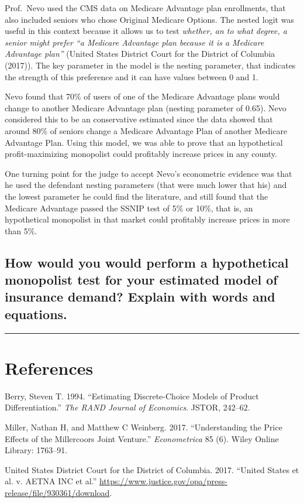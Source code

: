 \documentclass[]{article}
\begin{document}
Prof.~Nevo used the CMS data on Medicare Advantage plan enrollments,
that also included seniors who chose Original Medicare Options. The
nested logit was useful in this context because it allows us to test
\emph{whether, an to what degree, a senior might prefer ``a Medicare
Advantage plan because it is a Medicare Advantage plan''} (United States
District Court for the District of Columbia (2017)). The key parameter
in the model is the nesting parameter, that indicates the strength of
this preference and it can have values between 0 and 1.

Nevo found that 70\% of users of one of the Medicare Advantage plans
would change to another Medicare Advantage plan (nesting parameter of
0.65). Nevo considered this to be an conservative estimated since the
data showed that around 80\% of seniors change a Medicare Advantage Plan
of another Medicare Advantage Plan. Using this model, we was able to
prove that an hypothetical profit-maximizing monopolist could profitably
increase prices in any county.

One turning point for the judge to accept Nevo's econometric evidence
was that he used the defendant nesting parameters (that were much lower
that his) and the lowest parameter he could find the literature, and
still found that the Medicare Advantage passed the SSNIP test of 5\% or
10\%, that is, an hypothetical monopolist in that market could
profitably increase prices in more than 5\%.

\hypertarget{how-would-you-would-perform-a-hypothetical-monopolist-test-for-your-estimated-model-of-insurance-demand-explain-with-words-and-equations.}{%
\subsection{How would you would perform a hypothetical monopolist test
for your estimated model of insurance demand? Explain with words and
equations.}\label{how-would-you-would-perform-a-hypothetical-monopolist-test-for-your-estimated-model-of-insurance-demand-explain-with-words-and-equations.}}

\begin{center}\rule{0.5\linewidth}{\linethickness}\end{center}

\hypertarget{references}{%
\section*{References}\label{references}}

\hypertarget{refs}{}
\leavevmode\hypertarget{ref-berry1994}{}%
Berry, Steven T. 1994. ``Estimating Discrete-Choice Models of Product
Differentiation.'' \emph{The RAND Journal of Economics}. JSTOR, 242--62.

\leavevmode\hypertarget{ref-miller2017}{}%
Miller, Nathan H, and Matthew C Weinberg. 2017. ``Understanding the
Price Effects of the Millercoors Joint Venture.'' \emph{Econometrica} 85
(6). Wiley Online Library: 1763--91.

\leavevmode\hypertarget{ref-aetna}{}%
United States District Court for the District of Columbia. 2017.
``United States et al. v. AETNA INC et al.''
\url{https://www.justice.gov/opa/press-release/file/930361/download}.
\end{document}
